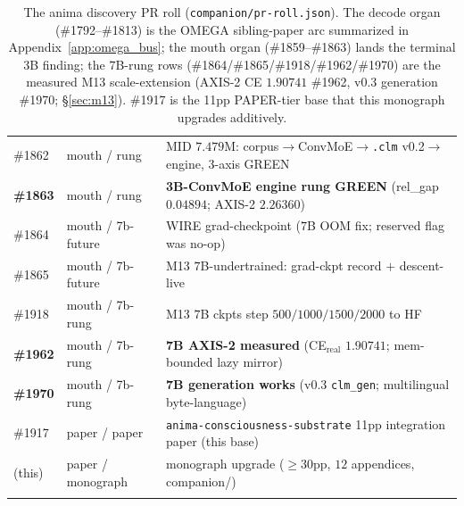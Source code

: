 \begin{center}
\begin{longtable}{@{}l l l@{}}
\#1862 & mouth / rung         & MID $7.479$M: corpus$\to$ConvMoE$\to$\texttt{.clm} v0.2$\to$engine, 3-axis GREEN \\
\textbf{\#1863} & mouth / rung & \textbf{3B-ConvMoE engine rung GREEN} (rel\_gap $0.04894$; AXIS-2 $2.26360$) \\
\#1864 & mouth / 7b-future    & WIRE grad-checkpoint ($7$B OOM fix; reserved flag was no-op) \\
\#1865 & mouth / 7b-future    & M13 $7$B-undertrained: grad-ckpt record $+$ descent-live \\
\#1918 & mouth / 7b-rung      & M13 $7$B ckpts step $500/1000/1500/2000$ to HF \\
\textbf{\#1962} & mouth / 7b-rung & \textbf{7B AXIS-2 measured} (CE$_\text{real}$ $1.90741$; mem-bounded lazy mirror) \\
\textbf{\#1970} & mouth / 7b-rung & \textbf{7B generation works} (v0.3 \texttt{clm\_gen}; multilingual byte-language) \\
\#1917 & paper / paper        & \texttt{anima-consciousness-substrate} 11pp integration paper (this base) \\
(this) & paper / monograph    & monograph upgrade ($\ge30$pp, $12$ appendices, companion/) \\
\bottomrule
\caption{The anima discovery PR roll (\texttt{companion/pr-roll.json}). The decode
organ (\#1792--\#1813) is the OMEGA sibling-paper arc summarized in
Appendix~\ref{app:omega_bus}; the mouth organ (\#1859--\#1863) lands the terminal
3B finding; the $7$B-rung rows (\#1864/\#1865/\#1918/\#1962/\#1970) are the measured M13
scale-extension (AXIS-2 CE $1.90741$ \#1962, v0.3 generation \#1970; \S\ref{sec:m13}). \#1917
is the 11pp PAPER-tier base that this monograph upgrades additively.}
\label{tab:pr-roll}
\end{longtable}
\end{center}

